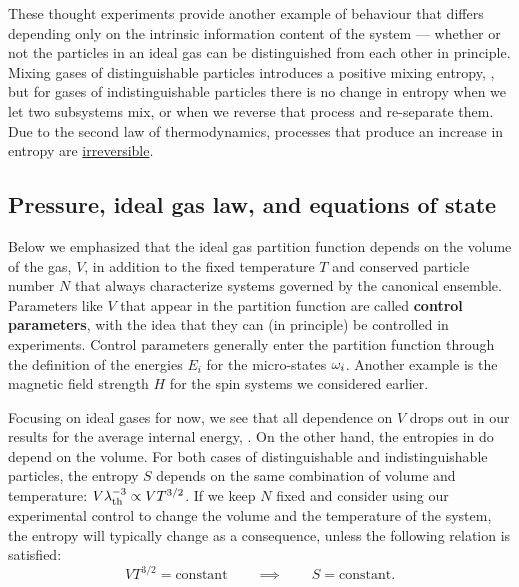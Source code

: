 These thought experiments provide another example of behaviour that differs depending only on the intrinsic information content of the system --- whether or not the particles in an ideal gas can be distinguished from each other in principle.
Mixing gases of distinguishable particles introduces a positive mixing entropy, , but for gases of indistinguishable particles there is no change in entropy when we let two subsystems mix, or when we reverse that process and re-separate them.
Due to the second law of thermodynamics, processes that produce an increase in entropy are \href{https://en.wikipedia.org/wiki/Irreversible_process}{irreversible}.



\subsection{\label{sec:ideal_gas}Pressure, ideal gas law, and equations of state}
Below  we emphasized that the ideal gas partition function depends on the volume of the gas, $V$, in addition to the fixed temperature $T$ and conserved particle number $N$ that always characterize systems governed by the canonical ensemble.
Parameters like $V$ that appear in the partition function are called \textbf{control parameters}, with the idea that they can (in principle) be controlled in experiments.
Control parameters generally enter the partition function through the definition of the energies $E_i$ for the micro-states $\omega_i$.
Another example is the magnetic field strength $H$ for the spin systems we considered earlier.

Focusing on ideal gases for now, we see that all dependence on $V$ drops out in our results for the average internal energy, .
On the other hand, the entropies in  do depend on the volume.
For both cases of distinguishable and indistinguishable particles, the entropy $S$ depends on the same combination of volume and temperature: $V \lambda_{\mathrm{th}}^{-3} \propto V T^{3/2}$.
If we keep $N$ fixed and consider using our experimental control to change the volume and the temperature of the system, the entropy will typically change as a consequence, unless the following relation is satisfied:
\begin{equation*}
  V T^{3/2} = \mbox{constant} \qquad \implies \qquad S = \mbox{constant.}
\end{equation*}

